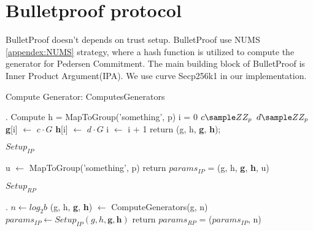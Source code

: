 \appendix


\section{Bulletproof protocol}
\label{appendix:bp}

BulletProof doesn't depends on trust setup. BulletProof use NUMS \ref{appendex:NUMS} strategy, where a hash function is utilized to compute the generator for Pedersen Commitment. The main building block of BulletProof is Inner Product Argument(IPA). We use curve Secp256k1 in our implementation.


\begin{algorithm}
 \DontPrintSemicolon
    \caption{Compute Generator: ComputesGenerators}
    \label{alg:ComputesGenerators}
    \LinesNumbered
    
    .
    Compute h = MapToGroup('something', p) \;
    i = 0 \;
     {
        $c \sample ZZ_p$ \;
        $d \sample ZZ_p$ \;
        \textbf{g}[i] $\gets$ $c\cdot G$ \;
        \textbf{h}[i] $\gets$ $d\cdot G$ \;
        i $\gets$ i + 1\;
    }
    return (g, h, \textbf{g}, \textbf{h});
\end{algorithm}

\begin{algorithm}
 \DontPrintSemicolon
    \caption{$Setup_{IP}$}
    \label{alg:setup_ip}
    \LinesNumbered
    
    
    u $\gets$  MapToGroup('something', p) \;
    return $params_{IP}$ = (g, h, \textbf{g}, \textbf{h}, u)
\end{algorithm}

\begin{algorithm}
 \DontPrintSemicolon
    \caption{$Setup_{RP}$}
    \label{alg:setup_rp}
    \LinesNumbered
    
    \KwIn{the input interval [a, b), and the field modulus p}.
     {
        $n \gets log_2b$ \;
        (g, h, \textbf{g}, \textbf{h}) $\gets$ ComputeGenerators(g, n) \;
        $params_{IP} \gets Setup_{IP}(g, h, \textbf{g}, \textbf{h})$ \;
        return $params_{RP}$ = ($params_{IP}$, n) \;
    }
\end{algorithm}

